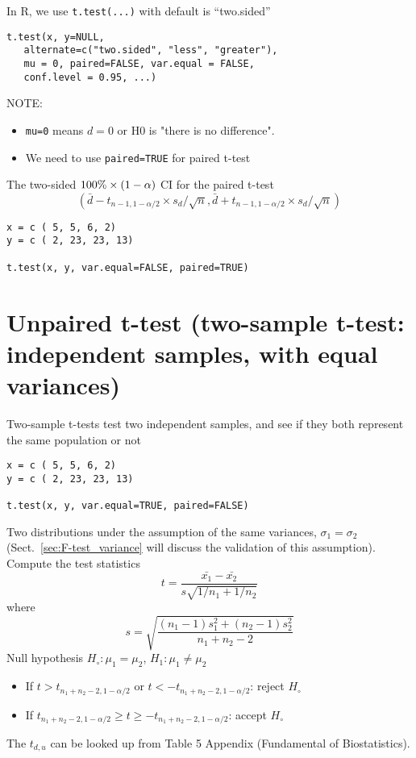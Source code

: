 \begin{framed}
  In R, we use \verb!t.test(...)! with default is ``two.sided''
\begin{lstlisting}
t.test(x, y=NULL, 
   alternate=c("two.sided", "less", "greater"), 
   mu = 0, paired=FALSE, var.equal = FALSE, 
   conf.level = 0.95, ...)
\end{lstlisting}
NOTE: 
\begin{itemize}
\item \verb!mu=0! means $d=0$ or H0 is "there is no difference". 
\item We need to use \verb!paired=TRUE! for paired t-test
\end{itemize}

\end{framed}

The two-sided $100\%\times (1-\alpha)$ CI for the paired t-test
\begin{equation}
  \label{eq:82}
  \left(\bar{d} - t_{n-1,1-\alpha/2} \times s_d/\sqrt{n}, \bar{d} +
    t_{n-1,1-\alpha/2} \times s_d/\sqrt{n} \right)
\end{equation}

\begin{lstlisting}
x = c ( 5, 5, 6, 2)
y = c ( 2, 23, 23, 13)

t.test(x, y, var.equal=FALSE, paired=TRUE)
\end{lstlisting}

\section[Unpaired t-test]{Unpaired t-test (two-sample t-test: independent
samples, with equal variances)}
\label{sec:unpaired-t-test}


Two-sample t-tests test two independent samples, and see if they both represent
the same population or not

\begin{lstlisting}
x = c ( 5, 5, 6, 2)
y = c ( 2, 23, 23, 13)

t.test(x, y, var.equal=TRUE, paired=FALSE)
\end{lstlisting}

Two distributions under the assumption of the same variances,
$\sigma_1=\sigma_2$ (Sect.~\ref{sec:F-test_variance} will discuss the
validation of this assumption). Compute the test statistics
\begin{equation}
  \label{eq:83}
  t = \frac{\bar{x_1}-\bar{x_2}}{s\sqrt{1/n_1+1/n_2}}
\end{equation}
where
\begin{equation}
  \label{eq:84}
  s = \sqrt{\frac{(n_1-1)s_1^2+(n_2-1)s_2^2}{n_1+n_2-2}}
\end{equation}
Null hypothesis $H_\circ: \mu_1 = \mu_2$, $H_1: \mu_1 \ne \mu_2$
\begin{itemize}
\item If $t > t_{n_1+n_2-2, 1-\alpha/2}$ or $t < -t_{n_1+n_2-2, 1-\alpha/2}$:
  reject $H_\circ$

\item If $t_{n_1+n_2-2, 1-\alpha/2} \ge t \ge -t_{n_1+n_2-2, 1-\alpha/2}$: accept
  $H_\circ$
\end{itemize}
The $t_{d,u}$ can be looked up from Table 5 Appendix (Fundamental of
Biostatistics). 

